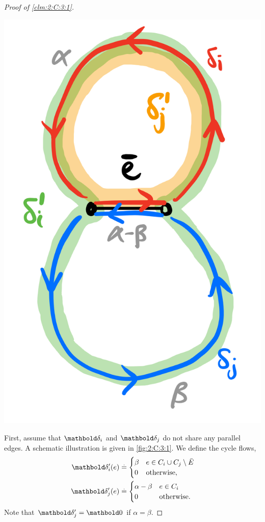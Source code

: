 \documentclass{tufte-handout}
\begin{document}
\begin{proof}[Proof of \cref{clm:2:C:3:1}]
\begin{marginfigure}[-3\baselineskip]
\includegraphics[width=\textwidth]{assignments/figures/cycle_decomposition.png}
\caption{Schematic illustration of the cycle flow update. $\vdelta_i$ sends $\alpha$ units of flow and $\vdelta_j$ sends $\beta$ units of flow. The net flow on the edge $\bar{e}$ is $\alpha - \beta$.}\label{fig:2:C:3:1}
\end{marginfigure}

First, assume that $\vdelta_i$ and $\vdelta_j$ do not share any parallel edges. A schematic illustration is given in \cref{fig:2:C:3:1}. We define the cycle flows, \begin{align*}
    \vdelta_i'(e) &\defeq \begin{cases}
        \beta & e \in C_i \cup C_j \setminus \bar{E} \\
        0 & \text{otherwise}, \\
    \end{cases} \\
    \vdelta_j'(e) &\defeq \begin{cases}
        \alpha - \beta & e \in C_i \\
        0 & \text{otherwise}. \\
    \end{cases}
\end{align*} Note that $\vdelta_j' = \vZero$ if $\alpha = \beta$.


\end{proof}
\end{document}
